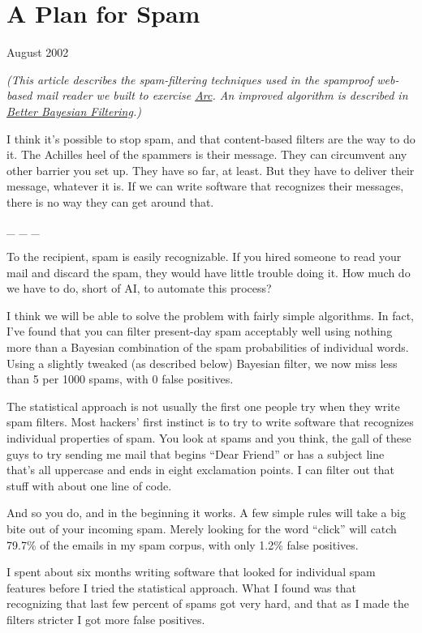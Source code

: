 \chapter{A Plan for Spam}

August 2002

\emph{(This article describes the spam-filtering techniques used in the
spamproof web-based mail reader we built to exercise
\href{arc.html}{Arc}. An improved algorithm is described in
\href{better.html}{Better Bayesian Filtering}.)}

I think it's possible to stop spam, and that content-based filters are
the way to do it. The Achilles heel of the spammers is their message.
They can circumvent any other barrier you set up. They have so far, at
least. But they have to deliver their message, whatever it is. If we can
write software that recognizes their messages, there is no way they can
get around that.

\_ \_ \_

To the recipient, spam is easily recognizable. If you hired someone to
read your mail and discard the spam, they would have little trouble
doing it. How much do we have to do, short of AI, to automate this
process?

I think we will be able to solve the problem with fairly simple
algorithms. In fact, I've found that you can filter present-day spam
acceptably well using nothing more than a Bayesian combination of the
spam probabilities of individual words. Using a slightly tweaked (as
described below) Bayesian filter, we now miss less than 5 per 1000
spams, with 0 false positives.

The statistical approach is not usually the first one people try when
they write spam filters. Most hackers' first instinct is to try to write
software that recognizes individual properties of spam. You look at
spams and you think, the gall of these guys to try sending me mail that
begins ``Dear Friend'' or has a subject line that's all uppercase and
ends in eight exclamation points. I can filter out that stuff with about
one line of code.

And so you do, and in the beginning it works. A few simple rules will
take a big bite out of your incoming spam. Merely looking for the word
``click'' will catch 79.7\% of the emails in my spam corpus, with only
1.2\% false positives.

I spent about six months writing software that looked for individual
spam features before I tried the statistical approach. What I found was
that recognizing that last few percent of spams got very hard, and that
as I made the filters stricter I got more false positives.

